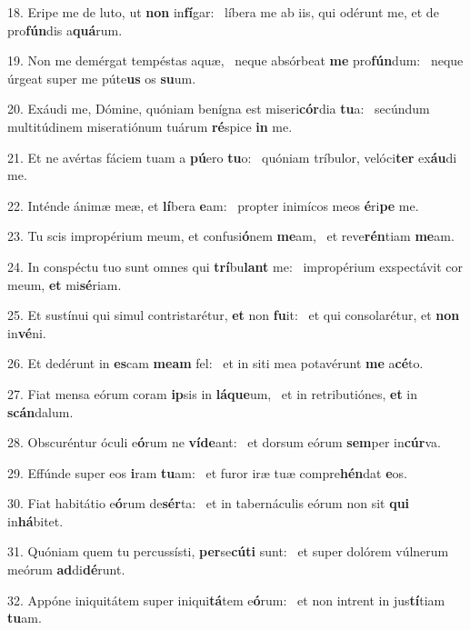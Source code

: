 18. Eripe me de luto, ut \textbf{non} in\textbf{fí}gar: \ast\  líbera me ab iis, qui odérunt me, et de pro\textbf{fún}dis a\textbf{quá}rum.\

19. Non me demérgat tempéstas aquæ, \dag\  neque absórbeat \textbf{me} pro\textbf{fún}dum: \ast\  neque úrgeat super me púte\textbf{us} os \textbf{su}um.\

20. Exáudi me, Dómine, quóniam benígna est miseri\textbf{cór}dia \textbf{tu}a: \ast\  secúndum multitúdinem miseratiónum tuárum \textbf{ré}spice \textbf{in} me.\

21. Et ne avértas fáciem tuam a \textbf{pú}ero \textbf{tu}o: \ast\  quóniam tríbulor, velóci\textbf{ter} ex\textbf{áu}di me.\

22. Inténde ánimæ meæ, et \textbf{lí}bera \textbf{e}am: \ast\  propter inimícos meos \textbf{é}ri\textbf{pe} me.\

23. Tu scis impropérium meum, et confusi\textbf{ó}nem \textbf{me}am, \ast\  et reve\textbf{rén}tiam \textbf{me}am.\

24. In conspéctu tuo sunt omnes qui \textbf{trí}bu\textbf{lant} me: \ast\  impropérium exspectávit cor meum, \textbf{et} mi\textbf{sé}riam.\

25. Et sustínui qui simul contristarétur, \textbf{et} non \textbf{fu}it: \ast\  et qui consolarétur, et \textbf{non} in\textbf{vé}ni.\

26. Et dedérunt in \textbf{es}cam \textbf{me}\textbf{am} fel: \ast\  et in siti mea potavérunt \textbf{me} a\textbf{cé}to.\

27. Fiat mensa eórum coram \textbf{ip}sis in \textbf{lá}\textbf{que}um, \ast\  et in retributiónes, \textbf{et} in \textbf{scán}dalum.\

28. Obscuréntur óculi e\textbf{ó}rum ne \textbf{ví}\textbf{de}ant: \ast\  et dorsum eórum \textbf{sem}per in\textbf{cúr}va.\

29. Effúnde super eos \textbf{i}ram \textbf{tu}am: \ast\  et furor iræ tuæ compre\textbf{hén}dat \textbf{e}os.\

30. Fiat habitátio e\textbf{ó}rum de\textbf{sér}ta: \ast\  et in tabernáculis eórum non sit \textbf{qui} in\textbf{há}bitet.\

31. Quóniam quem tu percussísti, \textbf{per}se\textbf{cú}\textbf{ti} sunt: \ast\  et super dolórem vúlnerum meórum \textbf{ad}di\textbf{dé}runt.\

32. Appóne iniquitátem super iniqui\textbf{tá}tem e\textbf{ó}rum: \ast\  et non intrent in jus\textbf{tí}tiam \textbf{tu}am.\

